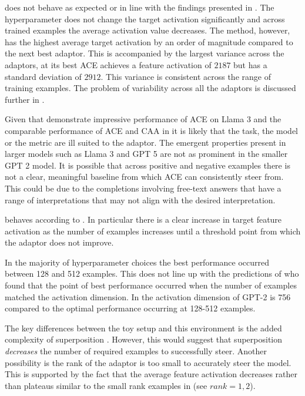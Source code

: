  does not behave as expected or in line with the findings presented in .
The hyperparameter does not change the target activation significantly and across trained examples the average activation value decreases.
The method, however, has the highest average target activation by an order of magnitude compared to the next best adaptor.
This is accompanied by the largest variance across the adaptors, at its best ACE achieves a feature activation of $2187$ but has a standard deviation of $2912$.
This variance is consistent across the range of training examples.
The problem of variability across all the adaptors is discussed further in .

Given that \citet{ace} demonstrate impressive performance of ACE on Llama 3 \citep{llama3} and the comparable performance of ACE and CAA in  it is likely that the task, the model or the metric are ill suited to the adaptor.
The emergent properties present in larger models such as Llama 3 \citep{llama3} and GPT 5 \citep{gpt-5} are not as prominent in the smaller GPT 2 \citep{gpt-2} model.
It is possible that across positive and negative examples there is not a clear, meaningful baseline from which ACE can consistently steer from.
This could be due to the completions involving free-text answers that have a range of interpretations that may not align with the desired interpretation.

 behaves according to \citet{steering-clear}.
In particular there is a clear increase in target feature activation as the number of examples increases until a threshold point from which the adaptor does not improve.

In the majority of hyperparameter choices the best performance occurred between 128 and 512 examples.
This does not line up with the predictions of \citet{steering-clear} who found that the point of best performance occurred when the number of examples matched the activation dimension.
In  the activation dimension of GPT-2 is 756 \citep{saelens} compared to the optimal performance occurring at 128-512 examples.

The key differences between the toy setup and this environment is the added complexity of superposition .
However, this would suggest that superposition \emph{decreases} the number of required examples to successfully steer.
Another possibility is the rank of the adaptor is too small to accurately steer the model.
This is supported by the fact that the average feature activation decreases rather than plateaus similar to the small rank examples in  (see $rank=1, 2$).

